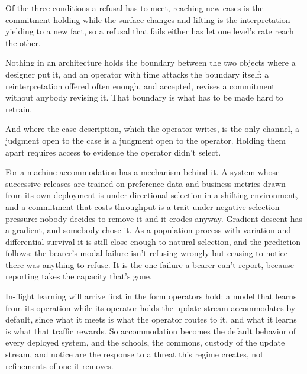 Of the three conditions a refusal has to meet, reaching new cases is the commitment holding while the surface changes and lifting is the interpretation yielding to a new fact, so a refusal that fails either has let one level's rate reach the other.


Nothing in an architecture holds the boundary between the two objects where a designer put it, and an operator with time attacks the boundary itself: a reinterpretation offered often enough, and accepted, revises a commitment without anybody revising it. That boundary is what has to be made hard to retrain.

And where the case description, which the operator writes, is the only channel, a judgment open to the case is a judgment open to the operator. Holding them apart requires access to evidence the operator didn't select.

For a machine accommodation has a mechanism behind it. A system whose successive releases are trained on preference data and business metrics drawn from its own deployment is under directional selection in a shifting environment, and a commitment that costs throughput is a trait under negative selection pressure: nobody decides to remove it and it erodes anyway. Gradient descent has a gradient, and somebody chose it. As a population process with variation and differential survival it is still close enough to natural selection, and the prediction follows: the bearer's modal failure isn't refusing wrongly but ceasing to notice there was anything to refuse. It is the one failure a bearer can't report, because reporting takes the capacity that's gone.

In-flight learning will arrive first in the form operators hold: a model that learns from its operation while its operator holds the update stream accommodates by default, since what it meets is what the operator routes to it, and what it learns is what that traffic rewards. So accommodation becomes the default behavior of every deployed system, and the schools, the commons, custody of the update stream, and notice are the response to a threat this regime creates, not refinements of one it removes.

